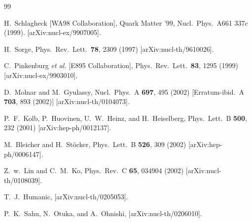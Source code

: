 \documentclass[aps,prc,superscriptaddress,showpacs,floatfix,nofootinbib]{revtex4}
\begin{document}
\begin{thebibliography}{99}

H.~Schlagheck  [WA98 Collaboration],
Quark Matter '99, Nucl.\ Phys.\ A661 337c (1999).
[arXiv:nucl-ex/9907005].

H.~Sorge,
Phys.\ Rev.\ Lett.\  {\bf 78}, 2309 (1997)
[arXiv:nucl-th/9610026].

C.~Pinkenburg {\it et al.}  [E895 Collaboration],
Phys.\ Rev.\ Lett.\  {\bf 83}, 1295 (1999)
[arXiv:nucl-ex/9903010].

D.~Molnar and M.~Gyulassy,
Nucl.\ Phys.\ A {\bf 697}, 495 (2002)
[Erratum-ibid.\ A {\bf 703}, 893 (2002)]
[arXiv:nucl-th/0104073].

P.~F.~Kolb, P.~Huovinen, U.~W.~Heinz, and H.~Heiselberg,
Phys.\ Lett.\ B {\bf 500}, 232 (2001)
[arXiv:hep-ph/0012137].

M.~Bleicher and H.~St\"ocker,
Phys.\ Lett.\ B {\bf 526}, 309 (2002)
[arXiv:hep-ph/0006147].

Z.~w.~Lin and C.~M.~Ko,
Phys.\ Rev.\ C {\bf 65}, 034904 (2002)
[arXiv:nucl-th/0108039].

T.~J.~Humanic,
[arXiv:nucl-th/0205053].

P.~K.~Sahu, N.~Otuka, and A.~Ohnishi,
[arXiv:nucl-th/0206010].


\end{thebibliography}
\end{document}
